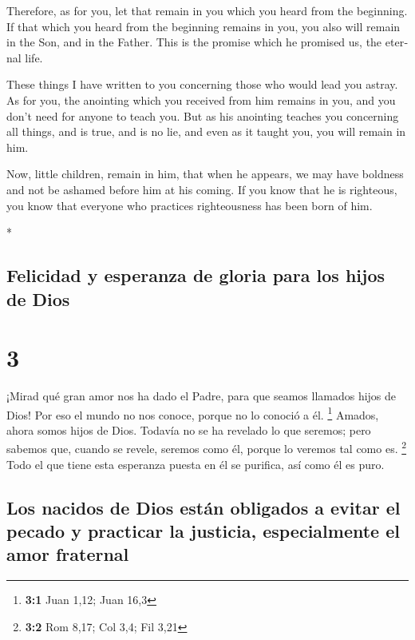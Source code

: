 \begin{paracol}{2}
\begin{otherlanguage}{english}
 Therefore, as for you, let that remain in you which you
heard from the beginning. If that which you heard from the beginning
remains in you, you also will remain in the Son, and in the Father.
 This is the promise which he promised us, the eternal
life.

 These things I have written to you concerning those who
would lead you astray.  As for you, the anointing which
you received from him remains in you, and you don't need for anyone to
teach you. But as his anointing teaches you concerning all things, and
is true, and is no lie, and even as it taught you, you will remain in
him.

 Now, little children, remain in him, that when he
appears, we may have boldness and not be ashamed before him at his
coming.  If you know that he is righteous, you know that
everyone who practices righteousness has been born of him.

\end{otherlanguage}

\switchcolumn[0]*

\hypertarget{felicidad-y-esperanza-de-gloria-para-los-hijos-de-dios}{%
\subsection{Felicidad y esperanza de gloria para los hijos de
Dios}\label{felicidad-y-esperanza-de-gloria-para-los-hijos-de-dios}}

\hypertarget{section-4}{%
\section{3}\label{section-4}}

 ¡Mirad qué gran amor nos ha dado el Padre, para que
seamos llamados hijos de Dios! Por eso el mundo no nos conoce, porque no
lo conoció a él. \footnote{\textbf{3:1} Juan 1,12; Juan 16,3}
 Amados, ahora somos hijos de Dios. Todavía no se ha
revelado lo que seremos; pero sabemos que, cuando se revele, seremos
como él, porque lo veremos tal como es. \footnote{\textbf{3:2} Rom 8,17;
  Col 3,4; Fil 3,21}  Todo el que tiene esta esperanza
puesta en él se purifica, así como él es puro.

\hypertarget{los-nacidos-de-dios-estuxe1n-obligados-a-evitar-el-pecado-y-practicar-la-justicia-especialmente-el-amor-fraternal}{%
\subsection{Los nacidos de Dios están obligados a evitar el pecado y
practicar la justicia, especialmente el amor
fraternal}\label{los-nacidos-de-dios-estuxe1n-obligados-a-evitar-el-pecado-y-practicar-la-justicia-especialmente-el-amor-fraternal}}


\end{paracol}
